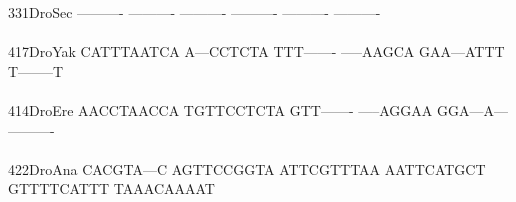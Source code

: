 \documentclass[11pt,twoside,reqno,a4paper]{article}
\begin{document}
{331\hspace*{2\charwidth}DroSec	----------	----------	----------	----------	----------	----------	\\
\hspace*{5\charwidth}\hspace*{7\charwidth}\hspace*{1\charwidth}\hspace*{1\charwidth}\hspace*{1\charwidth}\hspace*{1\charwidth}\hspace*{1\charwidth}\hspace*{1\charwidth}\\
417\hspace*{2\charwidth}DroYak	CATTTAATCA	A---CCTCTA	TTT-------	-----AAGCA	GAA---ATTT	T--------T	\\
\hspace*{5\charwidth}\hspace*{7\charwidth}\hspace*{1\charwidth}\hspace*{1\charwidth}\hspace*{1\charwidth}\hspace*{1\charwidth}\hspace*{1\charwidth}\hspace*{1\charwidth}\\
414\hspace*{2\charwidth}DroEre	AACCTAACCA	TGTTCCTCTA	GTT-------	-----AGGAA	GGA---A---	----------	\\
\hspace*{5\charwidth}\hspace*{7\charwidth}\hspace*{1\charwidth}\hspace*{1\charwidth}\hspace*{1\charwidth}\hspace*{1\charwidth}\hspace*{1\charwidth}\hspace*{1\charwidth}\\
422\hspace*{2\charwidth}DroAna	CACGTA---C	AGTTCCGGTA	ATTCGTTTAA	AATTCATGCT	GTTTTCATTT	TAAACAAAAT	\\
\hspace*{5\charwidth}\hspace*{7\charwidth}\hspace*{1\charwidth}\hspace*{1\charwidth}\hspace*{1\charwidth}\hspace*{1\charwidth}\hspace*{1\charwidth}\hspace*{1\charwidth}\\
}
\end{document}
